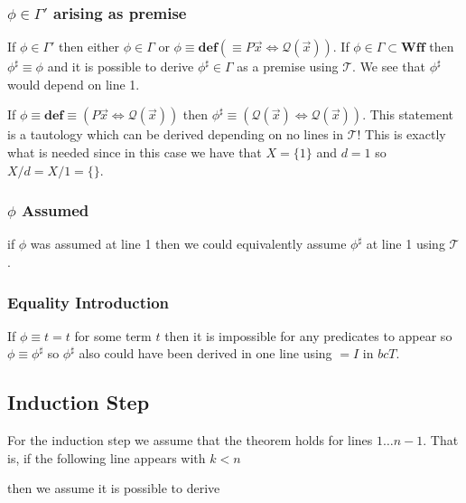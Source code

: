 \documentclass[12pt]{article}
\newcommand{\bv}[1]{\boldsymbol{#1}}
\newcommand{\mc}[1]{\mathcal{#1}}
\newcommand{\bc}[1]{\bv{\mc{#1}}}
\begin{document}
\subsubsection*{$\phi \in \Gamma'$ arising as premise}

If $\phi \in \Gamma'$ then either $\phi \in \Gamma$ or $\phi \equiv \textbf{def} (\equiv P\vec{x} \iff \mc{Q}(\vec{x}))$. If $\phi \in \Gamma \subset \textbf{Wff}$ then $\phi^{\sharp} \equiv \phi$ and it is possible to derive $\phi^{\sharp} \in \Gamma$ as a premise using $\bc{T}$. We see that $\phi^{\sharp}$ would depend on line 1.

If $\phi\equiv \textbf{def}\equiv(P\vec{x}\iff \mc{Q}(\vec{x}))$ then $\phi^{\sharp} \equiv (\mc{Q}(\vec{x})\iff\mc{Q}(\vec{x}))$. This statement is a tautology which can be derived depending on no lines in $\mc{T}$! This is exactly what is needed since in this case we have that $X=\{1\}$ and $d=1$ so $X/d = X/1 = \{\}$.

\subsubsection*{$\phi$ Assumed}

if $\phi$ was assumed at line 1 then we could equivalently assume $\phi^{\sharp}$ at line 1 using $\bc{T}$.

\subsubsection*{Equality Introduction}

If $\phi\equiv t=t$ for some term $t$ then it is impossible for any predicates to appear so $\phi \equiv \phi^{\sharp}$ so $\phi^{\sharp}$ also could have been derived in one line using $=I$ in $bc{T}$.

\subsection{Induction Step}

For the induction step we assume that the theorem holds for lines $1\ldots n-1$. That is, if the following line appears with $k < n$

\begin{ND}[][][][][.6\linewidth]
\end{ND}

then we assume it is possible to derive

\begin{ND}[][][][][.6\linewidth]
\end{ND}
\end{document}
